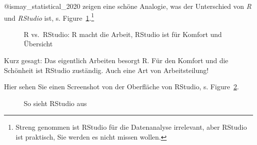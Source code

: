 \documentclass[
  letterpaper,
  DIV=11,
  numbers=noendperiod]{scrartcl}
\theoremstyle{definition}
\theoremstyle{definition}
\theoremstyle{definition}
\theoremstyle{remark}
\begin{document}
@ismay\_statistical\_2020 zeigen eine schöne Analogie, was der
Unterschied von \emph{R} und \emph{RStudio} ist, s.
Figure~\ref{fig-r-rstudio}.\footnote{Streng genommen ist RStudio für die
  Datenanalyse irrelevant, aber RStudio ist praktisch, Sie werden es
  nicht missen wollen.}

\begin{figure}


\caption{\label{fig-r-rstudio}R vs.~RStudio: R macht die Arbeit, RStudio
ist für Komfort und Übersicht}

\end{figure}%

Kurz gesagt: Das eigentlich Arbeiten besorgt R. Für den Komfort und die
Schönheit ist RStudio zuständig. Auch eine Art von Arbeitsteilung!

Hier sehen Sie einen Screenshot von der Oberfläche von RStudio, s.
Figure~\ref{fig-rstudio}.

\begin{figure}


\caption{\label{fig-rstudio}So sieht RStudio aus}

\end{figure}%
\end{document}
